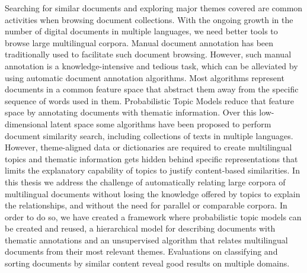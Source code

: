 


\begin{abstractslong}  
Searching for similar documents and exploring major themes covered are common activities when browsing document collections. With the ongoing growth in the number of digital documents in multiple languages, we need better tools to browse large multilingual corpora. Manual document annotation has been traditionally used to facilitate such document browsing. However, such manual annotation is a knowledge-intensive and tedious task, which can be alleviated by using automatic document annotation algorithms. Most  algorithms represent documents in a common feature space that abstract them away from the specific sequence of words used in them. Probabilistic Topic Models reduce that feature space by annotating documents with thematic information. Over this low-dimensional latent space some algorithms have been proposed to perform document similarity search, including collections of texts in multiple languages. However, theme-aligned data or dictionaries are required to create multilingual topics and thematic information gets hidden behind specific representations that limits the explanatory capability of topics to justify content-based similarities. In this thesis we address the challenge of automatically relating large corpora of multilingual documents without losing the knowledge offered by topics to explain the relationships, and without the need for parallel or comparable corpora. In order to do so, we have created a framework where probabilistic topic models can be created and reused, a hierarchical model for describing documents with thematic annotations and an unsupervised algorithm that relates multilingual documents from their most relevant themes. Evaluations on classifying and sorting documents by similar content reveal good results on multiple domains.


\end{abstractslong}

